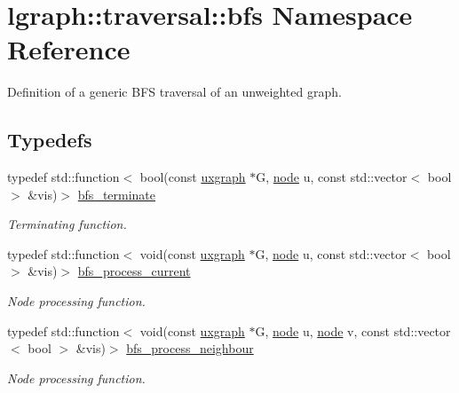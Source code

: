 \hypertarget{namespacelgraph_1_1traversal_1_1bfs}{}\section{lgraph\+:\+:traversal\+:\+:bfs Namespace Reference}
\label{namespacelgraph_1_1traversal_1_1bfs}


Definition of a generic B\+FS traversal of an unweighted graph.  


\subsection*{Typedefs}
\begin{DoxyCompactItemize}
\item 
typedef std\+::function$<$ bool(const \hyperlink{classlgraph_1_1uxgraph}{uxgraph} $\ast$G, \hyperlink{namespacelgraph_a397169dd66adf725210a30fb7251773e}{node} u, const std\+::vector$<$ bool $>$ \&vis)$>$ \hyperlink{namespacelgraph_1_1traversal_1_1bfs_aa4593f688322861facc9f6851df5dd01}{bfs\+\_\+terminate}
\begin{DoxyCompactList}\small\item\em Terminating function. \end{DoxyCompactList}\item 
typedef std\+::function$<$ void(const \hyperlink{classlgraph_1_1uxgraph}{uxgraph} $\ast$G, \hyperlink{namespacelgraph_a397169dd66adf725210a30fb7251773e}{node} u, const std\+::vector$<$ bool $>$ \&vis)$>$ \hyperlink{namespacelgraph_1_1traversal_1_1bfs_afe3126045b7607bea056d250cfcc4aba}{bfs\+\_\+process\+\_\+current}
\begin{DoxyCompactList}\small\item\em Node processing function. \end{DoxyCompactList}\item 
typedef std\+::function$<$ void(const \hyperlink{classlgraph_1_1uxgraph}{uxgraph} $\ast$G, \hyperlink{namespacelgraph_a397169dd66adf725210a30fb7251773e}{node} u, \hyperlink{namespacelgraph_a397169dd66adf725210a30fb7251773e}{node} v, const std\+::vector$<$ bool $>$ \&vis)$>$ \hyperlink{namespacelgraph_1_1traversal_1_1bfs_ae7d59c83c3c9fd50ed4afd8ed781bca9}{bfs\+\_\+process\+\_\+neighbour}
\begin{DoxyCompactList}\small\item\em Node processing function. \end{DoxyCompactList}\end{DoxyCompactItemize}
